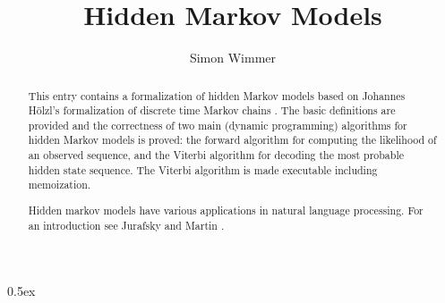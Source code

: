 \documentclass[11pt,a4paper]{article}
\begin{document}
\title{Hidden Markov Models}
\author{Simon Wimmer}
\maketitle

\begin{abstract}
This entry contains a formalization of hidden Markov models \cite{Markov13}
based on Johannes Hölzl's formalization of discrete time Markov chains \cite{hoelzl2017mdp}.
The basic definitions are provided and the correctness
of two main (dynamic programming) algorithms for hidden Markov models is proved:
the forward algorithm for computing the likelihood of an observed sequence,
and the Viterbi algorithm for decoding the most probable hidden state sequence.
The Viterbi algorithm is made executable including memoization.

Hidden markov models have various applications in natural language processing.
For an introduction see Jurafsky and Martin \cite{Jurafsky}.

\end{abstract}

\tableofcontents

\pagebreak

\parindent 0pt\parskip 0.5ex





\end{document}
